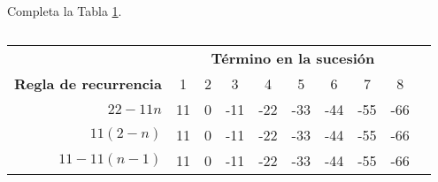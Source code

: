 \question[10] Completa la Tabla \ref{tab:3.8}.

\begin{table}[H]
    \centering
    \caption{}
    \label{tab:3.8}
    \begin{tabular}{|r|*{9}{c|}}
        \toprule
        \rowcolor{colorrds!80}
                                                                                            & \multicolumn{8}{c|}{\bfseries\color{white}Término en la sucesión}                                         \\ \cline{2-9}
        \multirow{-2}{*}{\cellcolor{colorrds!80}\bfseries\color{white}Regla de recurrencia} & 1                                                                 & 2 & 3   & 4   & 5   & 6   & 7   & 8   \\ \hline
        $22-11n$                                                                            & 11                                                                & 0 & -11 & -22 & -33 & -44 & -55 & -66 \\ \hline
        $11\left(2-n\right)$                                                                & 11                                                                & 0 & -11 & -22 & -33 & -44 & -55 & -66 \\ \hline
        $11-11\left(n-1\right)$                                                             & 11                                                                & 0 & -11 & -22 & -33 & -44 & -55 & -66 \\ \cline{2-9}
        \bottomrule
    \end{tabular}
\end{table}
